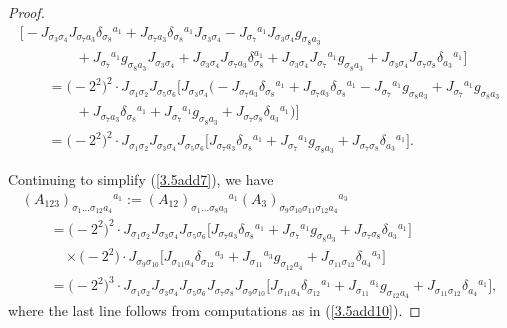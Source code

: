 \documentclass[pdftex]{sigma}
\numberwithin{equation}{section}
\theoremstyle{definition}
\begin{document}
\begin{proof}
\begin{gather}
\bigl[-J_{\sigma_3 \sigma_4} J_{\sigma_7 a_3} \delta_{\sigma_8}{}^{a_1}
+J_{\sigma_7 a_3} \delta_{\sigma_8}{}^{a_1} J_{\sigma_3 \sigma_4}
-J_{\sigma_7}{}^{a_1} J_{\sigma_3 \sigma_4} g_{\sigma_8 a_3}
 \nonumber\\
 \qquad\qquad{} +J_{\sigma_7}{}^{a_1} g_{\sigma_8 a_3} J_{\sigma_3 \sigma_4}
+J_{\sigma_3 \sigma_4} J_{\sigma_7 a_3} \delta_{\sigma_8}^{a_1}
+J_{\sigma_3 \sigma_4} J_{\sigma_7}{}^{a_1} g_{\sigma_8 a_3}
+J_{\sigma_3 \sigma_4} J_{\sigma_7 \sigma_8} \delta_{a_3}{}^{a_1}\bigr]
 \nonumber\\
\qquad{}=
\bigl(-2^2\bigr)^2\cdot J_{\sigma_1 \sigma_2} J_{\sigma_5 \sigma_6}
\bigl[ J_{\sigma_3 \sigma_4}
\bigl(-J_{\sigma_7 a_3} \delta_{\sigma_8}{}^{a_1}
+J_{\sigma_7 a_3} \delta_{\sigma_8}{}^{a_1}
-J_{\sigma_7}{}^{a_1} g_{\sigma_8 a_3}
+J_{\sigma_7}{}^{a_1} g_{\sigma_8 a_3}
\nonumber\\
\qquad\qquad{} +J_{\sigma_7 a_3} \delta_{\sigma_8}{}^{a_1} +J_{\sigma_7}{}^{a_1} g_{\sigma_8 a_3}
+J_{\sigma_7 \sigma_8} \delta_{a_3}{}^{a_1}\bigr) \bigr]
\nonumber\\
\qquad{}= \bigl(-2^2\bigr)^2 \cdot J_{\sigma_1 \sigma_2} J_{\sigma_3 \sigma_4}
J_{\sigma_5 \sigma_6}
\bigl[J_{\sigma_7 a_3} \delta_{\sigma_8}{}^{a_1}
+J_{\sigma_7}{}^{a_1} g_{\sigma_8 a_3}
+J_{\sigma_7 \sigma_8} \delta_{a_3}{}^{a_1}\bigr].\label{3.5add10}
\end{gather}



Continuing to simplify (\ref{3.5add7}), we have
\begin{gather*}
 {(A_{123})_{\sigma_1\dots\sigma_{12}a_4}{}^{a_1}
:= (A_{12})_{\sigma_1 \dots \sigma_8 a_3}{}^{a_1}
 ({A_3})_{\sigma_9 \sigma_{10} \sigma_{11} \sigma_{12} a_4}{}^{a_3} }\\
\qquad{} = \bigl(-2^2\bigr)^2 \cdot J_{\sigma_1 \sigma_2} J_{\sigma_3 \sigma_4}J_{\sigma_5 \sigma_6}
\bigl[J_{\sigma_7 a_3} \delta_{\sigma_8}{}^{a_1}
+J_{\sigma_7}{}^{a_1} g_{\sigma_8 a_3}
+J_{\sigma_7 \sigma_8} \delta_{a_3}{}^{a_1}\bigr]\\
\qquad\quad{} \times \bigl(-2^2\bigr)\cdot J_{\sigma_9\sigma_{10}}\bigl[J_{\sigma_{11}a_4}\delta_{\sigma_{12}}{}^{a_3}
+J_{\sigma_{11}}{}^{a_3} g_{\sigma_{12} a_4} + J_{\sigma_{11}\sigma_{12}}\delta_{a_4}{}^{a_3}\bigr]\\
\qquad{}= \bigl(-2^2\bigr)^3\cdot J_{\sigma_1 \sigma_2} J_{\sigma_3 \sigma_4}J_{\sigma_5 \sigma_6} J_{\sigma_7 \sigma_8}
J_{\sigma_9 \sigma_{10}}
\bigl[J_{\sigma_{11}a_4}\delta_{\sigma_{12}}{}^{a_1}+ J_{\sigma_{11}}{}^{a_1}g_{\sigma_{12}a_4} + J_{\sigma_{11}\sigma_{12}}\delta_{a_4}{}^{a_1}\bigr],
\end{gather*}
where the last line follows from computations as in (\ref{3.5add10}).


\end{proof}
\end{document}
